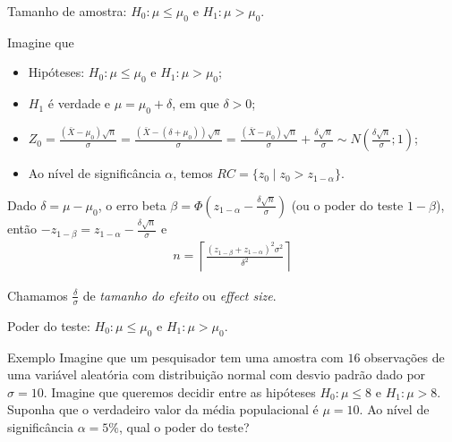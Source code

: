 \documentclass[8pt]{beamer}
\begin{document}
\begin{frame}{Tamanho de amostra: $H_0:\mu \leq \mu_0$ e $H_1: \mu > \mu_0$.}

Imagine que
\begin{itemize}
	\item Hipóteses: $H_0: \mu \leq \mu_0$ e $H_1: \mu > \mu_0$;
	\item $H_1$ é verdade e $\mu = \mu_0 + \delta$, em que $\delta > 0$;
	\item $Z_0 = \frac{(\bar{X} - \mu_0)\sqrt{n}}{\sigma} = \frac{(\bar{X} - (\delta + \mu_0))\sqrt{n}}{\sigma} = \frac{(\bar{X} - \mu_0)\sqrt{n}}{\sigma} + \frac{\delta\sqrt{n}}{\sigma} \sim N\left( \frac{\delta \sqrt{n}}{\sigma}; 1 \right)$;
	\item Ao nível de significância $\alpha$, temos $RC = \{ z_0 \mid z_0 > z_{1-\alpha}   \}$.
\end{itemize}
\vfill

Dado $\delta = \mu - \mu_0$, o erro beta $\beta = \Phi\left( z_{1-\alpha} - \frac{\delta\sqrt{n}}{\sigma} \right)$ (ou o poder do teste $1-\beta$), então $-z_{1-\beta} = z_{1-\alpha} - \frac{\delta\sqrt{n}}{\sigma}$ e 
\begin{align*}
n = \left\lceil \frac{(z_{1-\beta} + z_{1-\alpha})^2 \sigma^2}{\delta^2} \right\rceil
\end{align*}

Chamamos $\frac{\delta}{\sigma}$  de \textit{tamanho do efeito} ou \textit{effect size}.
\end{frame}

\begin{frame}{Poder do teste: $H_0:\mu \leq \mu_0$ e $H_1: \mu > \mu_0$.}

\large

\begin{block}{Exemplo}
Imagine que um pesquisador tem uma amostra com $16$ observações de uma variável aleatória com distribuição normal com desvio padrão dado por $\sigma=10$. Imagine que queremos decidir entre as hipóteses $H_0: \mu \leq 8$ e $H_1: \mu > 8$. Suponha que o verdadeiro valor da média populacional é $\mu = 10$. Ao nível de significância $\alpha=5\%$, qual o poder do teste?
\end{block}

\normalsize 

\end{frame}
\end{document}
